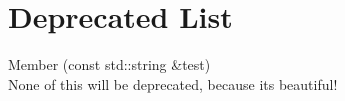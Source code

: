 \chapter{Deprecated List}
\hypertarget{deprecated}{}\label{deprecated}

\begin{DoxyRefList}
\item[Member \doxylink{classMyLibrary_1_1Example_a1c0046b0674eb4cad09c5d3e943912b8}{My\+Library\+::Example\+::test} (const std\+::string \&test)]\hfill \\
\label{deprecated__deprecated000001}%
%
None of this will be deprecated, because it\textquotesingle{}s beautiful!
\end{DoxyRefList}